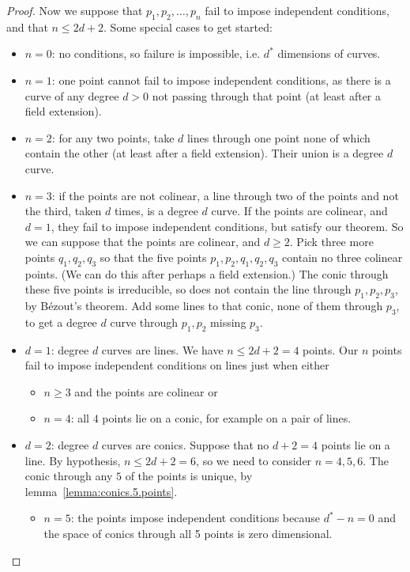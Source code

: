 \begin{proof}
Now we suppose that \(p_1,p_2,\dots,p_n\) fail to impose independent conditions, and that \(n \le 2d+2\).
Some special cases to get started:
\begin{itemize}
\item \(n=0\): no conditions, so failure is impossible, i.e. \(d^*\) dimensions of curves.
\item \(n=1\): one point cannot fail to impose independent conditions, as there is a curve of any degree \(d > 0\) not passing through that point (at least after a field extension).
\item \(n=2\): for any two points, take \(d\) lines through one point none of which contain the other (at least after a field extension). Their union is a degree \(d\) curve.
\item \(n=3\): if the points are not colinear, a line through two of the points and not the third, taken \(d\) times, is a degree \(d\) curve.
If the points are colinear, and \(d=1\), they fail to impose independent conditions, but satisfy our theorem.
So we can suppose that the points are colinear, and \(d \ge 2\).
Pick three more points \(q_1,q_2,q_3\) so that the five points \(p_1,p_2,q_1,q_2,q_3\) contain no three colinear points.
(We can do this after perhaps a field extension.)
The conic through these five points is irreducible, so does not contain the line through \(p_1,p_2,p_3\), by B\'ezout's theorem.
Add some lines to that conic, none of them through \(p_3\), to get a degree \(d\) curve through \(p_1,p_2\) missing \(p_3\).
\item \(d=1\): degree \(d\) curves are lines. 
We have \(n\le 2d+2=4\) points.
Our \(n\) points fail to impose independent conditions on lines just when either 
\begin{itemize}
\item
\(n\ge 3\) and the points are colinear or
\item
\(n=4\): all \(4\) points lie on a conic, for example on a pair of lines.
\end{itemize}
\item \(d=2\): degree \(d\) curves are conics.
Suppose that no \(d+2=4\) points lie on a line.
By hypothesis, \(n \le 2d+2=6\), so we need to consider \(n=4,5,6\).
The conic through any \(5\) of the points is unique, by lemma~\vref{lemma:conics.5.points}.
\begin{itemize}
\item
\(n=5\): the points impose independent conditions because \(d^*-n=0\) and the space of conics through all 5 points is zero dimensional.

\end{itemize}
\end{itemize}
\end{proof}
